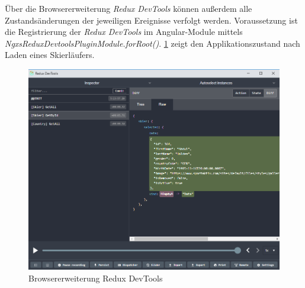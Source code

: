 Über die Browsererweiterung \emph{Redux DevTools} können außerdem alle Zustandsänderungen der jeweiligen Ereignisse verfolgt werden.
Voraussetzung ist die Registrierung der \emph{Redux DevTools} im Angular-Module mittels \emph{NgxsReduxDevtoolsPluginModule.forRoot()}.
\cref{fig:reduxDevTools} zeigt den Applikationszustand nach Laden eines Skierläufers.
\begin{figure}[H]
    \centering
    \includegraphics[width=0.9\linewidth]{images/redux-dev-tool}
    \caption{Browsererweiterung Redux DevTools}
\label{fig:reduxDevTools}
\end{figure}
